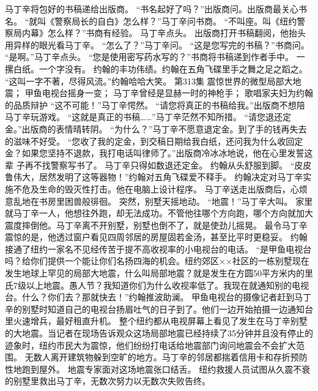 \documentclass[a4paper,12pt,UTF8,twoside]{ctexbook}
\begin{document}
        马丁辛将包好的书稿递给出版商。  
        “书名起好了吗？”出版商问。出版商最关心书名。  
        “就叫《警察局长的自白》怎么样？”马丁辛问书商。  
        “不叫座。叫《纽约警察局内幕》怎么样？”书商有经验。  
        马丁辛点头。  
        出版商打开书稿翻阅，他抬头用异样的眼光看马丁辛。  
        “怎么了？”马丁辛问。  
        “这是您写完的书稿？”书商问。  
        “是啊。”马丁辛点头。  
        “您是使用密写药水写的？”书商将书稿递到作者手中。  
        一摞白纸。一个字没有。  
        约翰的丰功伟绩。约翰在五角飞碟里手之舞之足之蹈之。  
        “这叫一字不著，尽得风流。”约翰哈哈大笑。          第313集  
        震惊世界的微型局部大地震；  
        甲鱼电视台摇身一变；  
        马丁辛曾经是显赫一时的神枪手；  
        歌唱家夫妇为约翰的品质辩护    
        “这不可能！”马丁辛愕然。  
        “请您将真正的书稿给我。”出版商不想陪马丁辛玩游戏。  
        “这就是真正的书稿……”马丁辛茫然不知所措。  
        “请您退还定金。”出版商的表情晴转阴。  
        “为什么？”马丁辛不愿意退定金。到了手的钱再失去的滋味不好受。  
        “您收了我的定金，到交稿日期给我白纸，还问我为什么收回定金？如果您坚持不退款，我打电话叫律师了。”出版商冷冰冰地说，他在心里发誓这辈        子再不找警察写书了。  
        马丁辛只得如数退还定金。  
        约翰从头舒服到脚。  
        “皮皮鲁伟大，居然发明了这等器物！”约翰对五角飞碟爱不释手。  
        约翰决定对马丁辛实施不危及生命的毁灭性打击。他在电脑上设计程序。  
        马丁辛送走出版商后，心烦意乱地在书房里困兽般徘徊。    
        突然，别墅天摇地动。  
        “地震！”马丁辛大叫。  
        家里就马丁辛一人，他想往外跑，却无法成功。不管他往哪个方向跑，哪个方向就加大震度摔倒他。马丁辛离不开别墅，别墅也倒不了，就是使劲儿摇晃。  
        最令马丁辛震惊的是，他透过窗户看见四周邻居的房屋固若金汤，甚至比平时更稳妥。  
        约翰接通了纽约一家名不见经传苦于提不高收视率的小电视台的电话。  
        “是甲鱼电视台吗？给你们提供一个能让你们名扬四海的机会。纽约郊区××社区的一栋别墅现在发生地球上罕见的局部大地震，什么叫局部地震？就是发生在方圆50平方米内的里氏7级以上地震。愚人节？我知道你们为什么收视率低了。我现在就通知别的电视台。什么？你们去？那就快去！”约翰推波助澜。  
        甲鱼电视台的摄像记者赶到马丁辛的别墅时知道自己的电视台扬眉吐气的日子到了。他们一边开始拍摄一边通知台里火速增兵，最好租直升机。  
        整个纽约都从电视屏幕上看见了发生在马丁辛别墅的大地震。当记者在现场告诉观众这场局部地震已经持续了35分钟并且没有停止的迹象时，纽约市民大为震惊，他们纷纷打电话给地震部门询问地震会不会扩大范围。  
        无数人离开建筑物躲到空旷的地方。马丁辛的邻居都揣着信用卡和存折预防性地跑到屋外。  
        地震专家面对这场地震张口结舌。  
        纽约救援人员试图从久震不衰的别墅里救出马丁辛，无数次努力以无数次失败告终。  
\end{document}
